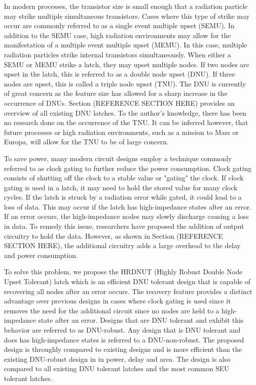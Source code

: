 In modern processes, the transistor size is small enough that a radiation particle may strike multiple simultaneous transistors. Cases where this type of strike may occur are commonly referred to as a single event multiple upset (SEMU). In addition to the SEMU case, high radiation environments may allow for the manifestation of a multiple event multiple upset (MEMU). In this case, multiple radiation particles strike internal transistors simultaneously. When either a SEMU or MEMU strike a latch, they may upset multiple nodes. If two nodes are upset in the latch, this is referred to as a double node upset (DNU). If three nodes are upset, this is called a triple node upset (TNU). The DNU is currently of great concern as the feature size has allowed for a sharp increase in the occurrence of DNUs. Section (REFERENCE SECTION HERE) provides an overview of all existing DNU latches.  To the author's knowledge, there has been no research done on the occurrence of the TNU. It can be inferred however, that future processes or high radiation environments, such as a mission to Mars or Europa, will allow for the TNU to be of large concern.     

To save power, many modern circuit designs employ a technique commonly referred to as clock gating to further reduce the power consumption. Clock gating consists of shutting off the clock to a stable value or "gating" the clock. If clock gating is used in a latch, it may need to hold the stored value for many clock cycles. If the latch is struck by a radiation error while gated, it could lead to a loss of data. This may occur if the latch has high-impedance states after an error. If an error occurs, the high-impedance nodes may slowly discharge causing a loss in data. To remedy this issue, researchers have proposed the addition of output circuitry to hold the data. However, as shown in Section (REFERENCE SECTION HERE), the additional circuitry adds a large overhead to the delay and power consumption.

To solve this problem, we propose the HRDNUT (Highly Robust Double Node Upset Tolerant) latch which is an efficient DNU tolerant design that is capable of recovering all nodes after an error occurs. The recovery feature provides a distinct advantage over previous designs in cases where clock gating is used since it removes the need for the additional circuit since no nodes are held to a high-impedance state after an error. Designs that are DNU tolerant and exhibit this behavior are referred to as DNU-robust. Any design that is DNU tolerant and does has high-impedance states is referred to a DNU-non-robust. The proposed design is throughly compared to existing designs and is more efficient than the existing DNU-robust design in \cite{DONUT} in power, delay and area. The design is also compared to all existing DNU tolerant latches and the most common SEU tolerant latches.

